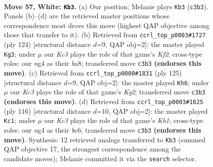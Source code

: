 \documentclass[11pt]{article}
\begin{document}
\clearpage

\begin{figure}[p]\centering
\begin{subfigure}{0.46\textwidth}\centering
\resizebox{\linewidth}{!}{%
\newchessgame
\chessboard[
  setfen={8/R7/6k1/1P6/P5n1/2K5/7r/8 w - - 0 57},
  showmover=false,
  pgfstyle=straightmove, color=movearrow, markmove={c3-b3}
]}
\caption{}
\end{subfigure}\hfill
\begin{subfigure}{0.46\textwidth}\centering
\resizebox{\linewidth}{!}{%
\newchessgame
\chessboard[
  setfen={b7/P7/3k4/R7/4r3/8/2P2K2/8 w - - 1 63},
  showmover=false,
  pgfstyle=straightmove, color=movearrow, markmove={f2-g3}
]}
\caption{}
\end{subfigure}
\\[4pt]
\begin{subfigure}{0.46\textwidth}\centering
\resizebox{\linewidth}{!}{%
\newchessgame
\chessboard[
  setfen={8/6k1/6p1/1N6/7r/R7/5K2/8 b - - 0 63},
  showmover=false,
  pgfstyle=straightmove, color=movearrow, markmove={g7-h6}
]}
\caption{}
\end{subfigure}\hfill
\begin{subfigure}{0.46\textwidth}\centering
\resizebox{\linewidth}{!}{%
\newchessgame
\chessboard[
  setfen={8/8/2b2k2/8/8/PP2R3/6r1/1K6 w - - 1 59},
  showmover=false,
  pgfstyle=straightmove, color=movearrow, markmove={b1-c1}
]}
\caption{}
\end{subfigure}
\caption{\textbf{Move 57, White: \texttt{Kb3}.} (a) Our position; Melanie plays \texttt{Kb3} (\texttt{c3b3}). Panels (b)--(d) are the retrieved master positions whose correspondence most drove this move (highest QAP objective among those that transfer to it). (b) Retrieved from \texttt{ccrl\_top\_p0003\#1727} (ply 124) [structural distance $d$=9, QAP obj=2]: the master played \texttt{Kg3}; under $\mu$ our \emph{Kc3} plays the role of that game's \emph{Kf2}; cross-type roles: our \emph{n}g4 as their \emph{b}a8; transferred move \texttt{c3b3} \textbf{(endorses this move)}. (c) Retrieved from \texttt{ccrl\_top\_p0000\#1831} (ply 125) [structural distance $d$=9, QAP obj=2]: the master played \texttt{Kh6}; under $\mu$ our \emph{Kc3} plays the role of that game's \emph{Kg2}; transferred move \texttt{c3b3} \textbf{(endorses this move)}. (d) Retrieved from \texttt{ccrl\_top\_p0003\#1625} (ply 116) [structural distance $d$=10, QAP obj=2]: the master played \texttt{Kc1}; under $\mu$ our \emph{Kc3} plays the role of that game's \emph{Kb1}; cross-type roles: our \emph{n}g4 as their \emph{b}c6; transferred move \texttt{c3b3} \textbf{(endorses this move)}. Synthesis: 12 retrieved analogs transferred to \texttt{Kb3} (summed QAP objective 17, the strongest correspondence among the candidate moves); Melanie committed it via the \texttt{search} selector.}
\label{fig:thought-m112}
\end{figure}
\end{document}
